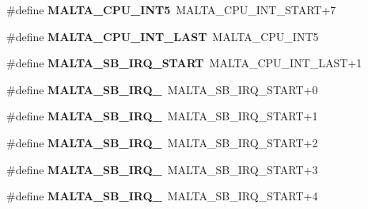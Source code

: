 \begin{DoxyCompactItemize}
\item 
\mbox{\label{group__bsp__interrupt_ga4f8248bdb9ecacc898b8bdb92d0772dc}} 
\#define {\bfseries M\+A\+L\+T\+A\+\_\+\+C\+P\+U\+\_\+\+I\+N\+T5}~M\+A\+L\+T\+A\+\_\+\+C\+P\+U\+\_\+\+I\+N\+T\+\_\+\+S\+T\+A\+RT+7
\item 
\mbox{\label{group__bsp__interrupt_gae9d07d8b67fd936bcbe48d8a33f57918}} 
\#define {\bfseries M\+A\+L\+T\+A\+\_\+\+C\+P\+U\+\_\+\+I\+N\+T\+\_\+\+L\+A\+ST}~M\+A\+L\+T\+A\+\_\+\+C\+P\+U\+\_\+\+I\+N\+T5
\item 
\mbox{\label{group__bsp__interrupt_gab5aa4f1e5cd11c970bf195634069b1b4}} 
\#define {\bfseries M\+A\+L\+T\+A\+\_\+\+S\+B\+\_\+\+I\+R\+Q\+\_\+\+S\+T\+A\+RT}~M\+A\+L\+T\+A\+\_\+\+C\+P\+U\+\_\+\+I\+N\+T\+\_\+\+L\+A\+ST+1
\item 
\mbox{\label{group__bsp__interrupt_gaa5b42d53ce7864934aaf7a1220807afa}} 
\#define {\bfseries M\+A\+L\+T\+A\+\_\+\+S\+B\+\_\+\+I\+R\+Q\+\_}~M\+A\+L\+T\+A\+\_\+\+S\+B\+\_\+\+I\+R\+Q\+\_\+\+S\+T\+A\+RT+0
\item 
\mbox{\label{group__bsp__interrupt_ga420c6a83a3aa8f93d7e617de6e896b5f}} 
\#define {\bfseries M\+A\+L\+T\+A\+\_\+\+S\+B\+\_\+\+I\+R\+Q\+\_}~M\+A\+L\+T\+A\+\_\+\+S\+B\+\_\+\+I\+R\+Q\+\_\+\+S\+T\+A\+RT+1
\item 
\mbox{\label{group__bsp__interrupt_ga22af335c24c1893612a0b7e2448d8128}} 
\#define {\bfseries M\+A\+L\+T\+A\+\_\+\+S\+B\+\_\+\+I\+R\+Q\+\_}~M\+A\+L\+T\+A\+\_\+\+S\+B\+\_\+\+I\+R\+Q\+\_\+\+S\+T\+A\+RT+2
\item 
\mbox{\label{group__bsp__interrupt_ga3e70c9d0bf11faca4a795fd47172d548}} 
\#define {\bfseries M\+A\+L\+T\+A\+\_\+\+S\+B\+\_\+\+I\+R\+Q\+\_}~M\+A\+L\+T\+A\+\_\+\+S\+B\+\_\+\+I\+R\+Q\+\_\+\+S\+T\+A\+RT+3
\item 
\mbox{\label{group__bsp__interrupt_ga78a1a978c0ac0431d122fc5d3dd7637c}} 
\#define {\bfseries M\+A\+L\+T\+A\+\_\+\+S\+B\+\_\+\+I\+R\+Q\+\_}~M\+A\+L\+T\+A\+\_\+\+S\+B\+\_\+\+I\+R\+Q\+\_\+\+S\+T\+A\+RT+4
\item 

\end{DoxyCompactItemize}
